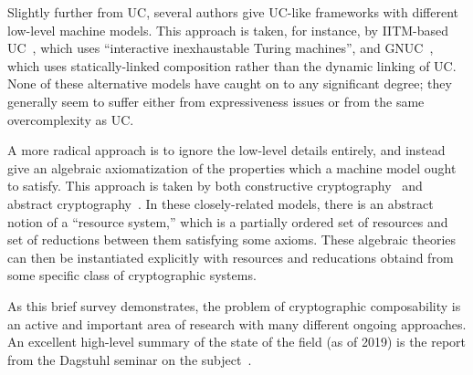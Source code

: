 Slightly further from UC, several authors give UC-like frameworks with different
low-level machine models. This approach is taken, for instance, by IITM-based
UC~\cite{camenisch-et-al-2019}, which uses ``interactive inexhaustable Turing
machines'', and GNUC~\cite{hofheinz-shoup-2011}, which uses statically-linked
composition rather than the dynamic linking of UC. None of these alternative
models have caught on to any significant degree; they generally seem to suffer
either from expressiveness issues or from the same overcomplexity as UC.

A more radical approach is to ignore the low-level details entirely, and
instead give an algebraic axiomatization of the properties which a machine model
ought to satisfy. This approach is taken by both constructive
cryptography~\cite{maurer-et-al-2012} and abstract
cryptography~\cite{maurer-renner-2011}.  In these closely-related models, there
is an abstract notion of a ``resource system,'' which is a partially ordered set
of resources and set of reductions between them satisfying some axioms. These
algebraic theories can then be instantiated explicitly with resources and
reducations obtaind from some specific class of cryptographic systems.

As this brief survey demonstrates, the problem of cryptographic composability is
an active and important area of research with many different ongoing approaches.
An excellent high-level summary of the state of the field (as of 2019) is the
report from the Dagstuhl seminar on the subject~\cite{camenisch-et-al-2019}.
